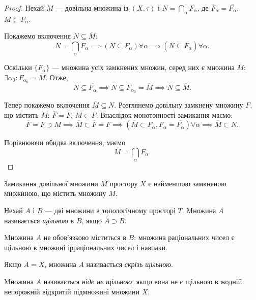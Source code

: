 \documentclass[a4paper, 12pt]{article}
\begin{document}
\begin{proof}
	Нехай $M$ --- довільна множина із $(X, \tau)$ і
	$N = \bigcap_\alpha F_\alpha$, де $F_\alpha = \overline{F_\alpha}$, $M \subset F_\alpha$. \smallskip

	Покажемо включення $N \subseteq \overline{M}$: \[N = \bigcap_\alpha F_\alpha \implies (N \subseteq F_\alpha) \forall \alpha \implies (N \subseteq \overline{F_\alpha}) \forall \alpha.\]

	Оскільки $\{F_\alpha\}$ --- множина усіх замкнених множин, серед
	них є множина $\overline{M}$: $\exists \alpha_0: F_{\alpha_0} = \overline{M}$. Отже, \[ N \subseteq \overline{F_\alpha} \implies N \subseteq F_{\alpha_0} = \overline{M} \implies N \subseteq \overline{M}. \]

	Тепер покажемо включення $\overline{M} \subseteq N$. Розглянемо довільну замкнену множину $F$, що містить $M$: $\overline{F} = F$, $M \subset F$. Внаслідок монотонності замикання маємо: \[ \overline{F} = F \supset M \implies \overline{M} \subset \overline{F} = F \implies (\overline{M} \subset F_\alpha, F_\alpha = \overline{F_\alpha}) \forall \alpha \implies \overline{M} \subset N. \]

	Порівнюючи обидва включення, маємо \[ \overline{M} = \bigcap_\alpha F_\alpha. \]
\end{proof}

\begin{corollary}
	Замикання довільної множини $M$ простору
	$X$ є найменшою замкненою множиною, що містить
	множину $M$.
\end{corollary}

\begin{definition}
	Нехай $A$ і $B$ --- дві множини в топологічному
	просторі $T$. Mножина $A$ називається \textit{щільною} в $B$, якщо
	$\overline{A} \supset B$.
\end{definition}

\begin{remark}
	Mножина $A$ не обов'язково міститься в
	$B$: множина раціональних чисел є щільною в множині
	ірраціональних чисел і навпаки.
\end{remark}

\begin{definition}
	Якщо $\overline{A} = X$, множина $A$ називається \textit{скрізь
	щільною}. 
\end{definition}

\begin{definition}
	Mножина $A$ називається \textit{ніде не щільною},
	якщо вона не є щільною в жодній непорожній відкритій
	підмножині множини $X$.
\end{definition}
\end{document}
